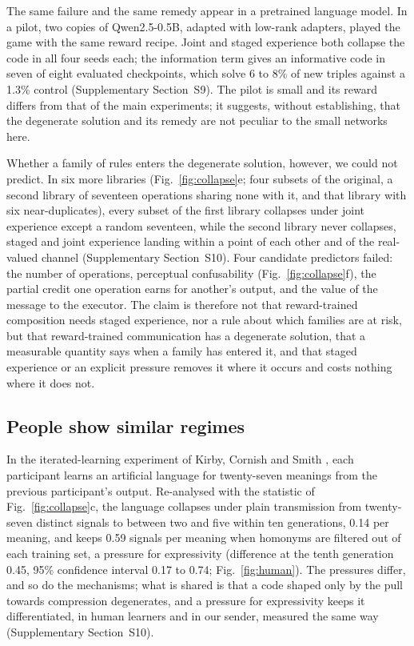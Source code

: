 \documentclass{nature}
\begin{document}
The same failure and the same remedy appear in a pretrained language model. In a pilot, two copies of
Qwen2.5-0.5B, adapted with low-rank adapters, played the game with the same reward recipe. Joint and staged
experience both collapse the code in all four seeds each; the information term gives an informative code in seven
of eight evaluated checkpoints, which solve 6 to 8\% of new triples against a 1.3\% control (Supplementary
Section~S9). The pilot is small and its reward differs from that of the main experiments; it suggests, without
establishing, that the degenerate solution and its remedy are not peculiar to the small networks here.

Whether a family of rules enters the degenerate solution, however, we could not predict. In six more libraries (Fig.~\ref{fig:collapse}e;
four subsets of the original, a second library of seventeen operations sharing none with it, and that library with
six near-duplicates), every subset of the first library collapses under joint experience except a random
seventeen, while the second library never collapses, staged and joint experience landing within a point of each
other and of the real-valued channel (Supplementary Section~S10). Four candidate predictors failed: the number of
operations, perceptual confusability (Fig.~\ref{fig:collapse}f), the partial credit one operation earns for
another's output, and the value of the message to the executor. The claim is therefore not that reward-trained
composition needs staged experience, nor a rule about which families are at risk, but that reward-trained
communication has a degenerate solution, that a measurable quantity says when a family has entered it, and that
staged experience or an explicit pressure removes it where it occurs and costs nothing where it does not.

\subsection*{People show similar regimes}

In the iterated-learning experiment of Kirby, Cornish and Smith
\cite{kirby2008}, each participant learns an artificial language for twenty-seven meanings from the previous
participant's output. Re-analysed with the statistic of Fig.~\ref{fig:collapse}c, the language collapses under plain
transmission from twenty-seven distinct signals to between two and five within ten generations, 0.14 per meaning,
and keeps 0.59 signals per meaning when homonyms are filtered out of each training set, a pressure for
expressivity (difference at the tenth generation 0.45, 95\% confidence interval 0.17 to 0.74; Fig.~\ref{fig:human}).
The pressures differ, and so do the mechanisms; what is shared is that a code shaped only by the pull towards
compression degenerates, and a pressure for expressivity keeps it differentiated, in human learners and in our
sender, measured the same way (Supplementary Section~S10).
\end{document}
